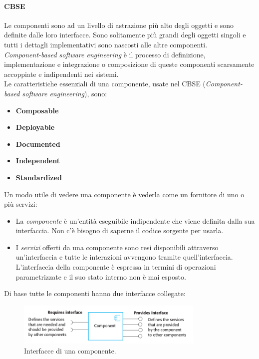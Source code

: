 	 	 	\paragraph{CBSE}
	 	 	Le componenti sono ad un livello di astrazione più alto degli oggetti e sono definite dalle loro interfacce. Sono solitamente più grandi degli oggetti singoli e tutti i dettagli implementativi sono nascosti alle altre componenti. \\
	 		\textit{Component-based software engineering} è il processo di definizione, implementazione e integrazione o composizione di queste componenti scarsamente accoppiate e indipendenti nei sistemi.  \\
	 		Le caratteristiche essenziali di una componente, usate nel CBSE (\textit{Component-based software engineering}), sono:
	 		\begin{itemize}
	 			\item \textbf{Composable}
	 			\item \textbf{Deployable}
	 			\item \textbf{Documented}
	 			\item \textbf{Independent}
	 			\item \textbf{Standardized}
	 		\end{itemize}
 			Un modo utile di vedere una componente è vederla come un fornitore di uno o più servizi:
 			\begin{itemize}
 				\item La \textit{componente} è un'entità eseguibile indipendente che viene definita dalla sua interfaccia. Non c'è bisogno di saperne il codice sorgente per usarla.
 				\item I \textit{servizi} offerti da una componente sono resi disponibili attraverso un'interfaccia e tutte le interazioni avvengono tramite quell'interfaccia. L'interfaccia della componente è espressa in termini di operazioni parametrizzate e il suo stato interno non è mai esposto.
 			\end{itemize}
 			Di base tutte le componenti hanno due interfacce collegate:

 			\begin{figure}[H]
 				\centering
 				\includegraphics[width=0.8\textwidth]{img/interfaces}
 				\caption{Interfacce di una componente.}
 			\end{figure}

